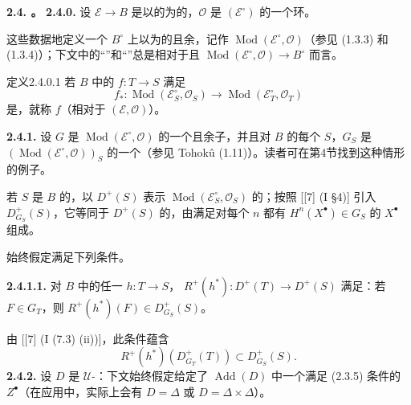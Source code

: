 \textbf{2.4. 。}
\textbf{2.4.0.} 设 $\mathscr E\to B$ 是以的为的，$\mathcal O$ 是 $(\mathscr E^\circ)$ 的一个环。

这些数据地定义一个 $B^\circ$ 上以为的且余，记作 $\operatorname{Mod}(\mathscr E^\circ,\mathcal O)$（参见 (1.3.3) 和 (1.3.4)）；下文中的“”和“”总是相对于且 $\operatorname{Mod}(\mathscr E^\circ,\mathcal O)\to B^\circ$ 而言。

\begin{SGAresult}{定义}{2.4.0.1}
若 $B$ 中的 $f:T\to S$ 满足
\[
f_*:\operatorname{Mod}(\mathscr E_S^\circ,\mathcal O_S)
\longrightarrow\operatorname{Mod}(\mathscr E_T^\circ,\mathcal O_T)
\]
是，就称 $f$（相对于 $(\mathscr E,\mathcal O)$）。
\end{SGAresult}
\textbf{2.4.1.} 设 $G$ 是 $\operatorname{Mod}(\mathscr E^\circ,\mathcal O)$ 的一个且余子，并且对 $B$ 的每个 $S$，$G_S$ 是 $(\operatorname{Mod}(\mathscr E^\circ,\mathcal O))_S$ 的一个（参见 Tohokû (1.11)）。读者可在第4节找到这种情形的例子。

若 $S$ 是 $B$ 的，以 $D^+(S)$ 表示 $\operatorname{Mod}(\mathscr E_S^\circ,\mathcal O_S)$ 的；按照 [[7] (I §4)] 引入 $D^+_{G_S}(S)$，它等同于 $D^+(S)$ 的，由满足对每个 $n$ 都有 $H^n(X^\bullet)\in G_S$ 的 $X^\bullet$ 组成。

始终假定满足下列条件。

\textbf{2.4.1.1.} 对 $B$ 中的任一 $h:T\to S$， $R^+(h^*):D^+(T)\to D^+(S)$ 满足：若 $F\in G_T$，则 $R^+(h^*)(F)\in D^+_{G_S}(S)$。

由 [[7] (I (7.3) (ii))]，此条件蕴含
\[
R^+(h^*)(D^+_{G_T}(T))\subset D^+_{G_S}(S).
\]
\textbf{2.4.2.} 设 $D$ 是 $\mathcal U$-：下文始终假定给定了 $\operatorname{Add}(D)$ 中一个满足 (2.3.5) 条件的 $Z^\bullet$（在应用中，实际上会有 $D=\Delta$ 或 $D=\Delta\times\Delta$）。

